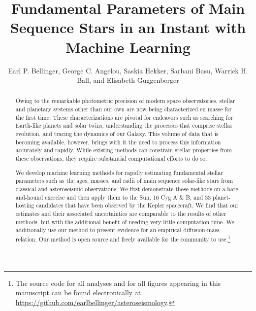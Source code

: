 \documentclass[twocolumn,twocolappendix]{aastex6}
\begin{document}
\title{Fundamental Parameters of Main Sequence Stars in an Instant with Machine Learning}

\author{Earl P. Bellinger, George C. Angelou, Saskia Hekker, Sarbani Basu, Warrick H. Ball, and Elisabeth Guggenberger}

\begin{abstract}
Owing to the remarkable photometric precision of modern space observatories, stellar and planetary systems other than our own are now being characterized en masse for the first time. These characterizations are pivotal for endeavors such as searching for Earth-like planets and solar twins, understanding the processes that comprise stellar evolution, and tracing the dynamics of our Galaxy. This volume of data that is becoming available, however, brings with it the need to process this information accurately and rapidly. While existing methods can constrain stellar properties from these observations, they require substantial computational efforts to do so. 

We develop machine learning methods for rapidly estimating fundamental stellar parameters such as the ages, masses, and radii of main sequence solar-like stars from classical and asteroseismic observations. We first demonstrate these methods on a hare-and-hound exercise and then apply them to the Sun, 16 Cyg A \& B, and 33 planet-hosting candidates that have been observed by the Kepler spacecraft. We find that our estimates and their associated uncertainties are comparable to the results of other methods, but with the additional benefit of needing very little computation time. We additionally use our method to present evidence for an empirical diffusion-mass relation. Our method is open source and freely available for the community to use.\footnote{The source code for all analyses and for all figures appearing in this manuscript can be found electronically at \url{https://github.com/earlbellinger/asteroseismology}.}
\end{abstract}
\end{document}
